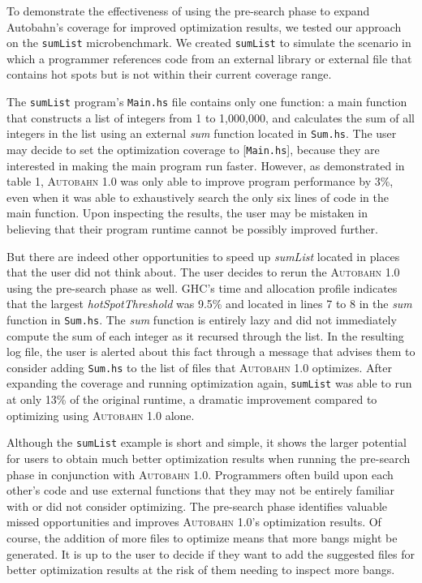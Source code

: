 \documentclass[format=sigplan, review=true]{acmart}
\newcommand{\hotspots}[0]{hot spots}
\newcommand{\hotspotcost}[0]{\textit{hotSpotThreshold}}
\newcommand{\Ao}[0]{\textsc{Autobahn 1.0}}
\newcommand{\preopt}[0]{pre-search}
\begin{document}
To demonstrate the effectiveness of using the \preopt{} phase to expand Autobahn's coverage for improved optimization results, we tested our approach on the \texttt{sumList} microbenchmark. We created \texttt{sumList} to simulate the scenario in which a programmer references code from an external library or external file that contains \hotspots{} but is not within their current coverage range. 


The \texttt{sumList} program's \texttt{Main.hs} file contains only one function: a main function that constructs a list of integers from 1 to 1,000,000, and calculates the sum of all integers in the list using an external \textit{sum} function located in \texttt{Sum.hs}. The user may decide to set the optimization coverage to [\texttt{Main.hs}], because they are interested in making the main program run faster. However, as demonstrated in table 1, \Ao{} was only able to improve program performance by 3\%, even when it was able to exhaustively search the only six lines of code in the main function. Upon inspecting the results, the user may be mistaken in believing that their program runtime cannot be possibly improved further. 

But there are indeed other opportunities to speed up \textit{sumList} located in places that the user did not think about. The user decides to rerun the \Ao{} using the \preopt{} phase as well. GHC's time and allocation profile indicates that the largest \hotspotcost{} was 9.5\% and located in lines 7 to 8 in the \textit{sum} function in \texttt{Sum.hs}. The \textit{sum} function is entirely lazy and did not immediately compute the sum of each integer as it recursed through the list. In the resulting log file, the user is alerted about this fact through a message that advises them to consider adding \texttt{Sum.hs} to the list of files that \Ao{} optimizes. After expanding the coverage and running optimization again, \texttt{sumList} was able to run at only 13\% of the original runtime, a dramatic improvement compared to optimizing using \Ao{} alone.

Although the \texttt{sumList} example is short and simple, it shows the larger potential for users to obtain much better optimization results when running the \preopt{} phase in conjunction with \Ao{}. Programmers often build upon each other's code and use external functions that they may not be entirely familiar with or did not consider optimizing. The \preopt{} phase identifies valuable missed opportunities and improves \Ao{}'s optimization results. Of course, the addition of more files to optimize means that more bangs might be generated. It is up to the user to decide if they want to add the suggested files for better optimization results at the risk of them needing to inspect more bangs.
\newline
\end{document}
